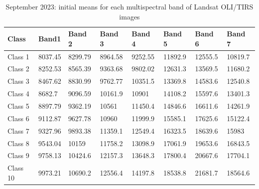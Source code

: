 \documentclass[geomatics,article,submit,pdftex,moreauthors]{Definitions/mdpi}
\begin{document}
\begin{table}[H]
\centering
\begin{tabularx}{\textwidth}{| p{1.5cm} | X | X | X | X | X | X | X | }
  \toprule
   Class & Band1 & Band 2 & Band 3 & Band 4 & Band 5 & Band 6 & Band 7  \\
   \midrule
    Class 1 & 8037.45 & 8299.79 & 8964.58 & 9252.55 & 11892.9 & 12555.5 & 10819.7 \\
    Class 2 & 8252.53 & 8565.39 & 9363.68 & 9802.02 & 12631.3 & 13569.5 & 11680.2 \\
    Class 3 & 8467.62 & 8830.99 & 9762.77 & 10351.5 & 13369.8 & 14583.6 & 12540.8 \\
    Class 4 & 8682.7 & 9096.59 & 10161.9 & 10901 & 14108.2 & 15597.6 & 13401.3 \\
    Class 5 & 8897.79 & 9362.19 & 10561 & 11450.4 & 14846.6 & 16611.6 & 14261.9 \\
    Class 6 & 9112.87 & 9627.78 & 10960 & 11999.9 & 15585.1 & 17625.6 & 15122.4 \\
    Class 7 & 9327.96 & 9893.38 & 11359.1 & 12549.4 & 16323.5 & 18639.6 & 15983 \\
    Class 8 & 9543.04 & 10159 & 11758.2 & 13098.9 & 17061.9 & 19653.6 & 16843.5 \\
    Class 9 & 9758.13 & 10424.6 & 12157.3 & 13648.3 & 17800.4 & 20667.6 & 17704.1 \\
    Class 10 & 9973.21 & 10690.2 & 12556.4 & 14197.8 & 18538.8 & 21681.7 & 18564.6 \\
    \bottomrule
\end{tabularx}
\caption{September 2023: initial means for each multispectral band of Landsat OLI/TIRS images}\label{tabA05}
\end{table}
\end{document}
